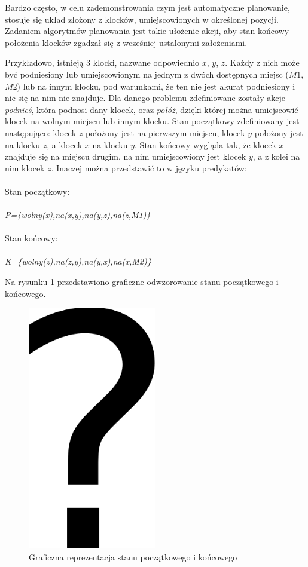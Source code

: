 Bardzo często, w celu zademonstrowania czym jest automatyczne planowanie, stosuje się układ złożony z klocków, umiejscowionych w określonej pozycji. Zadaniem algorytmów planowania jest takie ułożenie akcji, aby stan końcowy położenia klocków zgadzał się z wcześniej ustalonymi założeniami.

Przykładowo, istnieją 3 klocki, nazwane odpowiednio $x$, $y$, $z$. Każdy z nich może być podniesiony lub umiejscowionym na jednym z dwóch dostępnych miejsc ($M1$, $M2$) lub na innym klocku, pod warunkami, że ten nie jest akurat podniesiony i nic się na nim nie znajduje. Dla danego problemu zdefiniowane zostały akcje \emph{podnieś}, która podnosi dany klocek, oraz \emph{połóż}, dzięki której można umiejscowić klocek na wolnym miejscu lub innym klocku. Stan początkowy zdefiniowany jest następująco: klocek $z$ położony jest na pierwszym miejscu, klocek $y$ położony jest na klocku $z$, a klocek $x$ na klocku $y$. Stan końcowy wygląda tak, że klocek $x$ znajduje się na miejscu drugim, na nim umiejscowiony jest klocek $y$, a z kolei na nim klocek $z$. Inaczej można przedstawić to w języku predykatów:
\\\\
Stan początkowy:
\\\\
\textit{P=\{wolny(x),na(x,y),na(y,z),na(z,M1)\}}
\\\\
Stan końcowy:
\\\\
\textit{K=\{wolny(z),na(z,y),na(y,x),na(x,M2)\}}

Na rysunku \ref{fig:automatyczne-planowanie} przedstawiono graficzne odwzorowanie stanu początkowego i końcowego.
\begin{figure}[h!]
    \centering
    \includegraphics[width=0.5\textwidth]{img/rys2,1}
    \caption{Graficzna reprezentacja stanu początkowego i końcowego}
    \label{fig:automatyczne-planowanie}
\end{figure}



